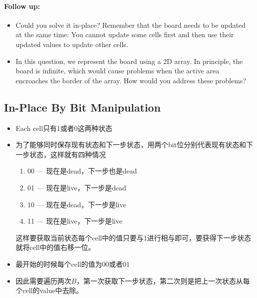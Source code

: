 \paragraph{Follow up:}

\begin{itemize}
\item Could you solve it in-place? Remember that the board needs to be updated at the same time: You cannot update some cells first and then use their updated values to update other cells.
\item In this question, we represent the board using a 2D array. In principle, the board is infinite, which would cause problems when the active area encroaches the border of the array. How would you address these problems?
\end{itemize}
\subsection{In-Place By Bit Manipulation}
\begin{itemize}
\item Each cell只有1或者0这两种状态
\item 为了能够同时保存现有状态和下一步状态，用两个bit位分别代表现有状态和下一步状态，这样就有四种情况
\begin{enumerate}
\item 00 --- 现在是dead，下一步也是dead
\item 01 --- 现在是live，下一步是dead
\item 10 --- 现在是dead，下一步是live
\item 11 --- 现在是live，下一步是live
\end{enumerate}
这样要获取当前状态每个cell中的值只要与1进行相与即可，要获得下一步状态就将cell中的值右移一位。
\item 最开始的时候每个cell的值为$00$或者$01$
\item 因此需要遍历两次$B$，第一次获取下一步状态，第二次则是把上一次状态从每个cell的value中去除。
\end{itemize}
\setcounter{lstlisting}{0}
